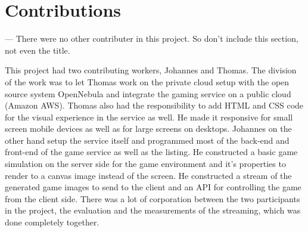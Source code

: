 \section{Contributions}
\label{ch:contrib}

--- There were no other contributer in this project. So don't include this section, not even the title.



\noindent
This project had two contributing workers, Johannes and Thomas. The division of the work was to let Thomas work on the private cloud setup with the open source system OpenNebula and integrate the gaming service on a public cloud (Amazon AWS). Thomas also had the responsibility to add HTML and CSS code for the visual experience in the service as well. He made it responsive for small screen mobile devices as well as for large screens on desktops. 
\newpara
Johannes on the other hand setup the service itself and programmed most of the back-end and front-end of the game service as well as the listing. He constructed a basic game simulation on the server side for the game environment and it's properties to render to a canvas image instead of the screen. He constructed a stream of the generated game images to send to the client and an API for controlling the game from the client side.
\newpara
There was a lot of corporation between the two participants in the project, the evaluation and the measurements of the streaming, which was done completely together.

\fi
